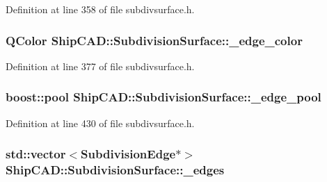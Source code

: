 Definition at line 358 of file subdivsurface.\-h.

\hypertarget{classShipCAD_1_1SubdivisionSurface_aced3b075062f92e55b3a89729cad3fd2}{
\subsubsection[{\-\_\-edge\-\_\-color}]{\setlength{\rightskip}{0pt plus 5cm}Q\-Color Ship\-C\-A\-D\-::\-Subdivision\-Surface\-::\-\_\-edge\-\_\-color\hspace{0.3cm}{\ttfamily [protected]}}}\label{classShipCAD_1_1SubdivisionSurface_aced3b075062f92e55b3a89729cad3fd2}


Definition at line 377 of file subdivsurface.\-h.

\hypertarget{classShipCAD_1_1SubdivisionSurface_a7a7e25c91a06ca2b3f3d27a5ca310f08}{
\subsubsection[{\-\_\-edge\-\_\-pool}]{\setlength{\rightskip}{0pt plus 5cm}boost\-::pool Ship\-C\-A\-D\-::\-Subdivision\-Surface\-::\-\_\-edge\-\_\-pool\hspace{0.3cm}{\ttfamily [protected]}}}\label{classShipCAD_1_1SubdivisionSurface_a7a7e25c91a06ca2b3f3d27a5ca310f08}


Definition at line 430 of file subdivsurface.\-h.

\hypertarget{classShipCAD_1_1SubdivisionSurface_a709c44779394f03c06c16adba6187ecd}{
\subsubsection[{\-\_\-edges}]{\setlength{\rightskip}{0pt plus 5cm}std\-::vector$<${\bf Subdivision\-Edge}$\ast$$>$ Ship\-C\-A\-D\-::\-Subdivision\-Surface\-::\-\_\-edges\hspace{0.3cm}{\ttfamily [protected]}}}\label{classShipCAD_1_1SubdivisionSurface_a709c44779394f03c06c16adba6187ecd}


